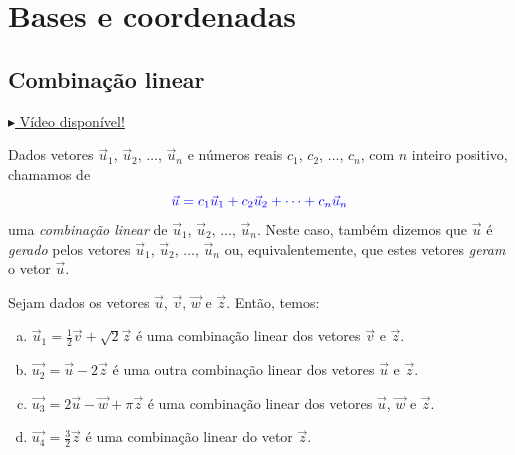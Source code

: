 
\chapter{Bases e coordenadas}\label{cap_base}
\thispagestyle{fancy}

\section{Combinação linear}\label{cap_base_sec_comblin}

\begin{flushright}
  \href{https://archive.org/details/combinacao-linear}{$\blacktriangleright$ Vídeo disponível!}
\end{flushright}

Dados vetores $\vec{u}_1$, $\vec{u}_2$, $\dotsc$, $\vec{u}_n$ e números reais $c_1$, $c_2$, $\dotsc$, $c_n$, com $n$ inteiro positivo, chamamos de
\begin{equation}
  {\color{blue}\vec{u} = c_1\vec{u}_1 + c_2\vec{u}_2 + \cdots + c_n\vec{u}_n}
\end{equation}
uma \emph{combinação linear} de $\vec{u}_1$, $\vec{u}_2$, $\dotsc$, $\vec{u}_n$. Neste caso, também dizemos que $\vec{u}$ é \emph{gerado} pelos vetores $\vec{u}_1$, $\vec{u}_2$, $\dotsc$, $\vec{u}_n$ ou, equivalentemente, que estes vetores \emph{geram} o vetor $\vec{u}$.

\begin{ex}\label{ex:comblinear}
  Sejam dados os vetores $\vec{u}$, $\vec{v}$, $\vec{w}$ e $\vec{z}$. Então, temos:
  \begin{enumerate}[a)]
  \item $\vec{u}_1 = \frac{1}{2}\vec{v} + \sqrt{2}\vec{z}$ é uma combinação linear dos vetores $\vec{v}$ e $\vec{z}$.
  \item $\vec{u_2} = \vec{u} - 2\vec{z}$ é uma outra combinação linear dos vetores $\vec{u}$ e $\vec{z}$.
  \item $\vec{u_3} = 2\vec{u} - \vec{w} + \pi\vec{z}$ é uma combinação linear dos vetores $\vec{u}$, $\vec{w}$ e $\vec{z}$.
  \item $\vec{u_4} = \frac{3}{2}\vec{z}$ é uma combinação linear do vetor $\vec{z}$.
  \end{enumerate}
\end{ex}

